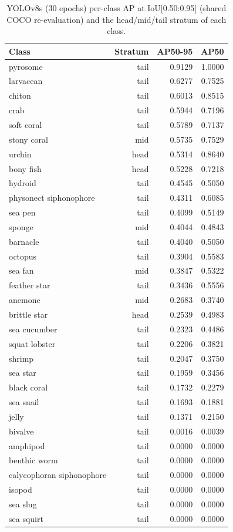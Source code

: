 \documentclass[11pt,a4paper,twocolumn]{article}
\begin{document}
\begin{longtable}{@{}l r r r@{}}
  \caption{YOLOv8s (30 epochs) per-class AP at IoU[0.50:0.95] (shared COCO re-evaluation) and the head/mid/tail stratum of each class.}\\
  \toprule
  Class & Stratum & AP50-95 & AP50 \\
  \midrule
  \endhead
  pyrosome & tail & 0.9129 & 1.0000 \\
  larvacean & tail & 0.6277 & 0.7525 \\
  chiton & tail & 0.6013 & 0.8515 \\
  crab & tail & 0.5944 & 0.7196 \\
  soft coral & tail & 0.5789 & 0.7137 \\
  stony coral & mid & 0.5735 & 0.7529 \\
  urchin & head & 0.5314 & 0.8640 \\
  bony fish & head & 0.5228 & 0.7218 \\
  hydroid & tail & 0.4545 & 0.5050 \\
  physonect siphonophore & tail & 0.4311 & 0.6085 \\
  sea pen & tail & 0.4099 & 0.5149 \\
  sponge & mid & 0.4044 & 0.4843 \\
  barnacle & tail & 0.4040 & 0.5050 \\
  octopus & tail & 0.3904 & 0.5583 \\
  sea fan & mid & 0.3847 & 0.5322 \\
  feather star & tail & 0.3436 & 0.5556 \\
  anemone & mid & 0.2683 & 0.3740 \\
  brittle star & head & 0.2539 & 0.4983 \\
  sea cucumber & tail & 0.2323 & 0.4486 \\
  squat lobster & tail & 0.2206 & 0.3821 \\
  shrimp & tail & 0.2047 & 0.3750 \\
  sea star & tail & 0.1959 & 0.3456 \\
  black coral & tail & 0.1732 & 0.2279 \\
  sea snail & tail & 0.1693 & 0.1881 \\
  jelly & tail & 0.1371 & 0.2150 \\
  bivalve & tail & 0.0016 & 0.0039 \\
  amphipod & tail & 0.0000 & 0.0000 \\
  benthic worm & tail & 0.0000 & 0.0000 \\
  calycophoran siphonophore & tail & 0.0000 & 0.0000 \\
  isopod & tail & 0.0000 & 0.0000 \\
  sea slug & tail & 0.0000 & 0.0000 \\
  sea squirt & tail & 0.0000 & 0.0000 \\
  \bottomrule
\end{longtable}
\end{document}
